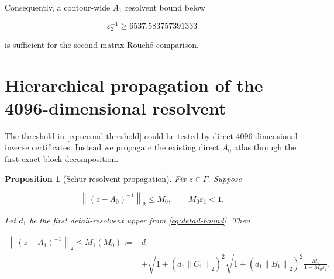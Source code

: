\documentclass[11pt]{article}
\newtheorem{proposition}[theorem]{Proposition}
\theoremstyle{definition}
\theoremstyle{remark}
\newcommand{\norm}[1]{\left\lVert #1\right\rVert}
\newcommand{\eps}{\varepsilon}
\begin{document}
Consequently, a contour-wide $A_1$ resolvent bound below

\begin{equation}
 \eps_2^{-1}\ge6537.583757391333
 \label{eq:second-threshold}
\end{equation}

is sufficient for the second matrix Rouch\'e comparison.

\section{Hierarchical propagation of the 4096-dimensional resolvent}
\label{sec:propagation}

The threshold in \eqref{eq:second-threshold} could be tested by direct
$4096$-dimensional inverse certificates.  Instead we propagate the existing
direct $A_0$ atlas through the first exact block decomposition.

\begin{proposition}[Schur resolvent propagation]
\label{prop:resolvent-propagation}
Fix $z\in\Gamma$.  Suppose

\[
\norm{(z-A_0)^{-1}}_2\le M_0,
\qquad M_0\eps_1<1.
\]

Let $d_1$ be the first detail-resolvent upper from
\eqref{eq:detail-bound}.  Then

\begin{equation}
\begin{split}
 \norm{(z-A_1)^{-1}}_2
 \le M_1(M_0):={}&d_1\\
 &+\sqrt{1+(d_1\norm{C_1}_2)^2}
 \sqrt{1+(d_1\norm{B_1}_2)^2}
 \frac{M_0}{1-M_0\eps_1}.
\end{split}
\label{eq:propagated-bound}
\end{equation}
\end{proposition}
\end{document}
